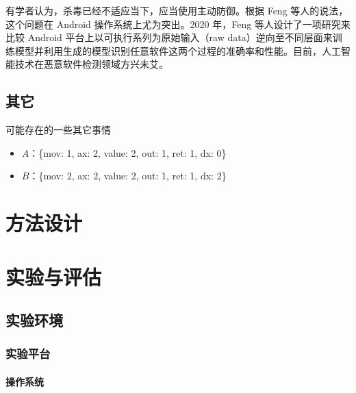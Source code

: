 \documentclass[14pt]{jnuthesis}
\begin{document}

有学者认为，杀毒已经不适应当下，应当使用主动防御。根据 Feng 等人的说法，这个问题在 Android 操作系统上尤为突出。2020 年，Feng 等人设计了一项研究来比较 Android 平台上以可执行系列为原始输入（raw data）逆向至不同层面来训练模型并利用生成的模型识别任意软件这两个过程的准确率和性能。目前，人工智能技术在恶意软件检测领域方兴未艾。

\section{其它}

可能存在的一些其它事情

\begin{itemize}
	\item $A$：\{\textquotesingle mov\textquotesingle: 1, \textquotesingle ax\textquotesingle: 2, \textquotesingle value\textquotesingle: 2, \textquotesingle out\textquotesingle: 1, \textquotesingle ret\textquotesingle: 1, \textquotesingle dx\textquotesingle: 0\}
	\item $B$：\{\textquotesingle mov\textquotesingle: 2, \textquotesingle ax\textquotesingle: 2, \textquotesingle value\textquotesingle: 2, \textquotesingle out\textquotesingle: 1, \textquotesingle ret\textquotesingle: 1, \textquotesingle dx\textquotesingle: 2\}
\end{itemize}

\chapter{方法设计}
\label{chap:3}

\chapter{实验与评估}
\label{chap:4}

\section{实验环境}

\subsection{实验平台} %

\subsubsection{操作系统}
\end{document}
